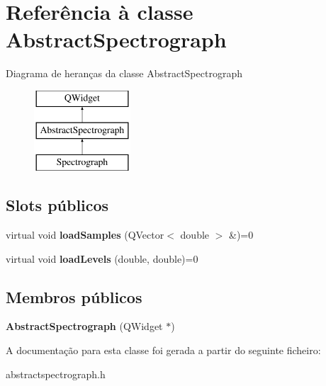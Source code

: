 \hypertarget{class_abstract_spectrograph}{\section{Referência à classe Abstract\-Spectrograph}
\label{class_abstract_spectrograph}
}
Diagrama de heranças da classe Abstract\-Spectrograph\begin{figure}[H]
\begin{center}
\leavevmode
\includegraphics[height=3.000000cm]{class_abstract_spectrograph}
\end{center}
\end{figure}
\subsection*{Slots públicos}
\begin{DoxyCompactItemize}
\item 
\hypertarget{class_abstract_spectrograph_a63839b1e9464f8000a9469f013a6e30c}{virtual void {\bfseries load\-Samples} (Q\-Vector$<$ double $>$ \&)=0}\label{class_abstract_spectrograph_a63839b1e9464f8000a9469f013a6e30c}

\item 
\hypertarget{class_abstract_spectrograph_a04da5584e18bbd8954d9daef88418daa}{virtual void {\bfseries load\-Levels} (double, double)=0}\label{class_abstract_spectrograph_a04da5584e18bbd8954d9daef88418daa}

\end{DoxyCompactItemize}
\subsection*{Membros públicos}
\begin{DoxyCompactItemize}
\item 
\hypertarget{class_abstract_spectrograph_a623904d57582b553e0c15005a3690fd0}{{\bfseries Abstract\-Spectrograph} (Q\-Widget $\ast$)}\label{class_abstract_spectrograph_a623904d57582b553e0c15005a3690fd0}

\end{DoxyCompactItemize}


A documentação para esta classe foi gerada a partir do seguinte ficheiro\-:\begin{DoxyCompactItemize}
\item 
abstractspectrograph.\-h\end{DoxyCompactItemize}
